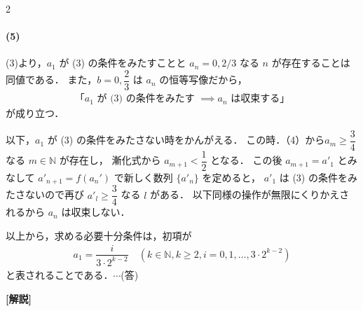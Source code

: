 \documentclass[../../main.tex]{subfiles}
\begin{document}
\begin{multicols}{2}
  \paragraph{(5)}
  (3)より，$a_1$ が (3) の条件をみたすことと $a_n=0, 2/3$ なる $n$ が存在することは同値である．
  また，$b=0, \dfrac{2}{3}$ は $a_n$ の恒等写像だから，
  \begin{align}
    \text{「$a_1$ が (3) の条件をみたす $\implies a_n$ は収束する」} \label{eq:1}
  \end{align}
  が成り立つ．

  以下，$a_1$ が (3) の条件をみたさない時をかんがえる．
  この時．（4）から$a_m \ge \dfrac{3}{4}$ なる $m \in \mathbb{N}$ が存在し，
  漸化式から $a_{m+1} < \dfrac{1}{2}$ となる．
  この後 $a_{m+1}=a'_1$ とみなして $a'_{n+1} = f(a_n')$ で新しく数列 $\{a'_n\}$ を定めると，
  $a'_{1}$ は (3) の条件をみたさないので再び $a'_{l} \ge \dfrac{3}{4}$ なる $l$ がある．
  以下同様の操作が無限にくりかえされるから $a_n$ は収束しない．

  以上から，求める必要十分条件は，初項が
  \begin{align}
    a_1 = \dfrac{i}{3 \cdot 2^{k-2}} \quad (k \in \mathbb{N}, k \ge 2, i=0,1,\dots,3 \cdot 2^{k-2})
  \end{align}
  と表されることである．$\cdots$(答)

  {\bf [解説]}

  \newpage
\end{multicols}
\end{document}
